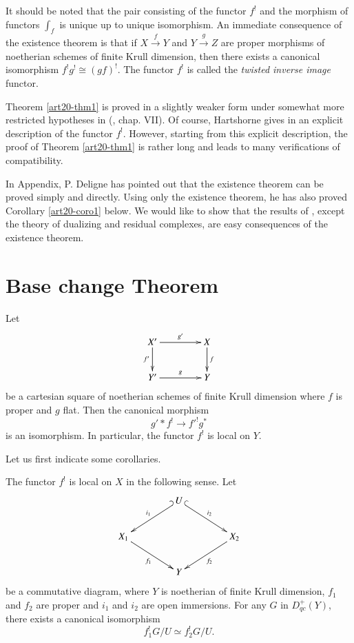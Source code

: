 It should be noted that the pair consisting of the functor $f^{!}$ and the morphism of functors $\int_{f}$ is unique up to unique isomorphism. An immediate consequence of the existence theorem is that if $X\xrightarrow{f}Y$ and $Y\xrightarrow{g}Z$ are proper morphisms of noetherian schemes of finite Krull dimension, then there exists a canonical isomorphism $f^{!}g^{!}\cong (gf)^{!}$. The functor $f^{!}$ is called the {\em twisted inverse image} functor.

Theorem \ref{art20-thm1} is proved in a slightly weaker form under somewhat more restricted hypotheses in (\cite{art20-key1}, chap. VII). Of course, Hartshorne gives in \cite{art20-key1} an explicit description of the functor $f^{!}$. However, starting from this explicit description, the proof of Theorem \ref{art20-thm1} is rather long and leads to many verifications of compatibility.

In \cite{art20-key1} Appendix, P. Deligne has pointed out that the existence theorem can be proved simply and directly. Using only the existence theorem, he has also proved Corollary \ref{art20-coro1} below. We would like to show that the results of \cite{art20-key1}, except the theory of dualizing and residual complexes, are easy consequences of the existence theorem.

\section{Base change Theorem}\label{art20-sec2}

\setcounter{theorem}{1}
\begin{theorem}\label{ART20-THM2}
Let
\[
\xymatrix@C=1.5cm{
X'\ar[d]_-{f'}\ar[r]^-{g'} & X\ar[d]^-{f}\\
Y'\ar[r]^-{g} & Y
}
\]
be a cartesian square of noetherian schemes of finite Krull dimension where $f$ is proper and $g$ flat. Then the canonical morphism
\begin{equation}
g'\ast f^{!}\to {f'}^{!}g^{*}\label{art20-2.1}
\end{equation}\pageoriginale
is an isomorphism. In particular, the functor $f^{!}$ is local on $Y$.
\end{theorem}

Let us first indicate some corollaries.

\begin{corollary}\label{art20-coro1}
The functor $f^{!}$ is local on $X$ in the following sense. Let
\[
\xymatrix@C=1.5cm{
 & U\ar@{_(->}[dl]_-{i_{1}}\ar@{^(->}[dr]^-{i_{2}} & \\
X_{1}\ar[dr]_-{f_{1}} & & X_{2}\ar[dl]^-{f_{2}}\\
 & Y & 
}
\]
be a commutative diagram, where $Y$ is noetherian of finite Krull dimension, $f_{1}$ and $f_{2}$ are proper and $i_{1}$ and $i_{2}$ are open immersions. For any $G$ in $D^{+}_{qc}(Y)$, there exists a canonical isomorphism
$$
f^{!}_{1}G/U\simeq f^{!}_{2}G/U.
$$
\end{corollary}

